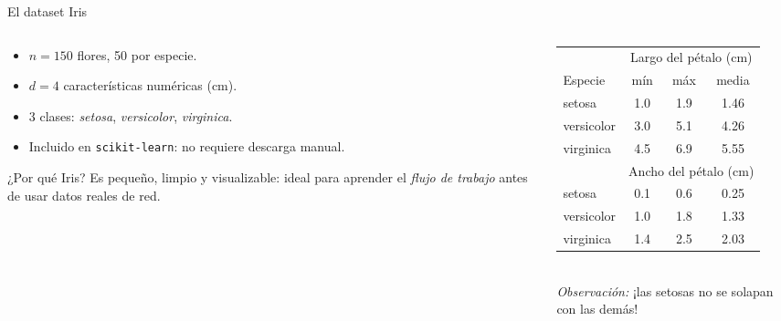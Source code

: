\documentclass[10pt,aspectratio=169]{beamer}
\begin{document}
\begin{frame}{El dataset Iris}
  \begin{columns}[c]
    \begin{column}{0.45\textwidth}
      \begin{itemize}
        \item $n = 150$ flores, 50 por especie.
        \item $d = 4$ características numéricas (cm).
        \item 3 clases: \emph{setosa}, \emph{versicolor}, \emph{virginica}.
        \item Incluido en \texttt{scikit-learn}: no requiere descarga manual.
      \end{itemize}
      \medskip
      \begin{block}{¿Por qué Iris?}
        \small Es pequeño, limpio y visualizable: ideal para aprender el \emph{flujo de trabajo} antes de usar datos reales de red.
      \end{block}
    \end{column}
    \begin{column}{0.53\textwidth}
      \centering\footnotesize
      \begin{tabular}{l ccc}
        \toprule
        & \multicolumn{3}{c}{Largo del pétalo (cm)} \\
        \cmidrule(lr){2-4}
        Especie & mín & máx & media \\
        \midrule
        setosa     & 1.0 & 1.9 & 1.46 \\
        versicolor & 3.0 & 5.1 & 4.26 \\
        virginica  & 4.5 & 6.9 & 5.55 \\
        \midrule
        & \multicolumn{3}{c}{Ancho del pétalo (cm)} \\
        \cmidrule(lr){2-4}
        setosa     & 0.1 & 0.6 & 0.25 \\
        versicolor & 1.0 & 1.8 & 1.33 \\
        virginica  & 1.4 & 2.5 & 2.03 \\
        \bottomrule
      \end{tabular}\\[0.4em]
      \emph{Observación:} ¡las setosas no se solapan con las demás!
    \end{column}
  \end{columns}
\end{frame}
\end{document}
